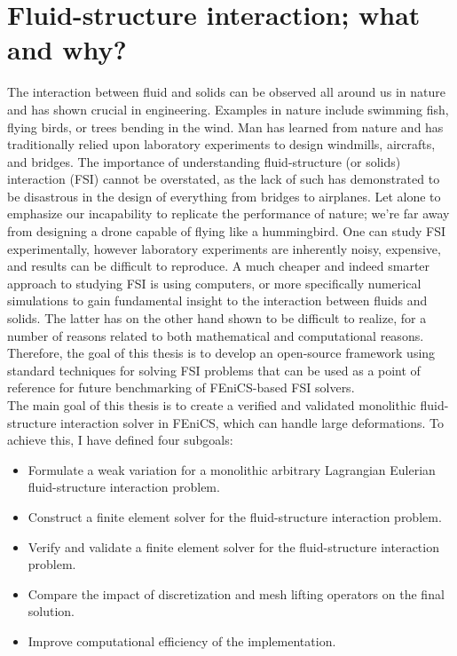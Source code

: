 \chapter*{Fluid-structure interaction; what and why?}
The interaction between fluid and solids can be observed all around us in nature and has shown crucial in engineering. Examples in nature include swimming fish, flying birds, or trees bending in the wind. Man has learned from nature and has traditionally relied upon laboratory experiments to design windmills, aircrafts, and bridges. The importance of understanding fluid-structure (or solids) interaction (FSI) cannot be overstated, as the lack of such has demonstrated to be disastrous in the design of everything from bridges to airplanes. Let alone to emphasize our incapability to replicate the performance of nature; we're far away from designing a drone capable of flying like a hummingbird. One can study FSI experimentally, however laboratory experiments are inherently noisy, expensive, and results can be difficult to reproduce. A much cheaper and indeed smarter approach to studying FSI is using computers, or more specifically numerical simulations to gain fundamental insight to the interaction between fluids and solids. The latter has on the other hand shown to be difficult to realize, for a number of reasons related to both mathematical and computational reasons. Therefore, the goal of this thesis is to develop an open-source framework using standard techniques for solving FSI problems that can be used as a point of reference for future benchmarking of FEniCS-based FSI solvers. \\

The main goal of this thesis is to create a verified and validated monolithic fluid-structure interaction solver in FEniCS, which can handle large deformations. To achieve this, I have defined four subgoals: 

\begin{itemize}
\item Formulate a weak variation for a monolithic arbitrary Lagrangian Eulerian fluid-structure interaction problem.
\item Construct a finite element solver for the fluid-structure interaction problem.
\item Verify and validate a finite element solver for the fluid-structure interaction problem.
\item Compare the impact of discretization and mesh lifting operators on the final solution.
\item Improve computational efficiency of the implementation.
\end{itemize}

